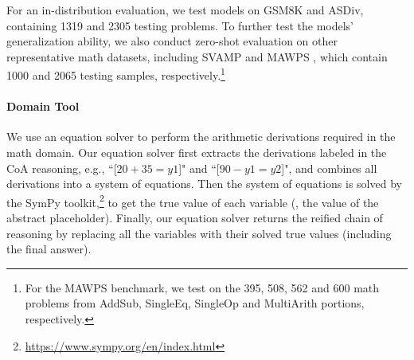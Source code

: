 For an in-distribution evaluation, we test models on GSM8K and ASDiv, containing 1319 and 2305 testing problems.
To further test the models' generalization ability, we also conduct zero-shot evaluation on other representative math datasets, including SVAMP \citep{patel2021nlp} and MAWPS \citep{koncel2016mawps}, which contain 1000 and 2065 testing samples, respectively.\footnote{For the MAWPS benchmark, we test on the 395, 508, 562 and 600 math problems from AddSub, SingleEq, SingleOp and MultiArith portions, respectively.}

\paragraph{Domain Tool}
We use an equation solver to perform the arithmetic derivations required in the math domain.
Our equation solver first extracts the derivations labeled in the CoA reasoning, e.g., ``[$20 + 35 = y1$]" and ``[$90 - y1 = y2$]", and combines all derivations into a system of equations.
Then the system of equations is solved by the SymPy toolkit,\footnote{\url{https://www.sympy.org/en/index.html}} to get the true value of each variable (\ie{}, the value of the abstract placeholder).
Finally, our equation solver returns the reified chain of reasoning by replacing all the variables with their solved true values (including the final answer).

\begin{table}[t]
\centering
{}
\caption{Example of CoA fine-tuning data construction in Wiki QA domain.}
\label{tab:rewrite_example_wiki}
\end{table}

